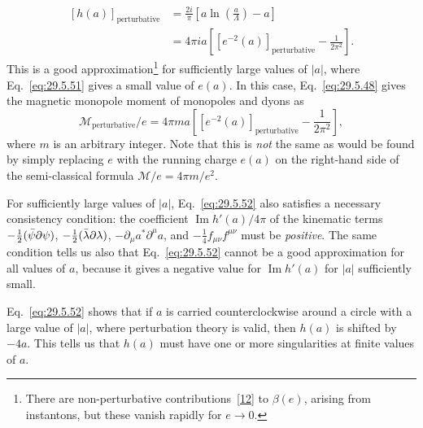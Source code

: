\begin{equation}
  \begin{aligned}
  [h(a)]_{\mathrm{perturbative}}
  &=\frac{2i}{\pi}\left[
    a\ln\left(\frac{a}{\Lambda}\right)-a
  \right]
  \\
  &=4\pi ia\left[
    \left[e^{-2}(a)\right]_{\mathrm{perturbative}}
    -\frac{1}{2\pi^2}
  \right].
  \end{aligned}
  \tag{29.5.52}\label{eq:29.5.52}
\end{equation}
\enlargethispage{2pt}
This is a good approximation\footnote{There are non-perturbative
contributions~\hyperref[ch29-ref-12]{[12]} to \(\beta(e)\), arising from
instantons, but these vanish rapidly for \(e\longrightarrow0\).} for
sufficiently large values of \(\lvert a\rvert\), where
Eq.~\eqref{eq:29.5.51} gives a small value of \(e(a)\). In this case,
Eq.~\eqref{eq:29.5.48} gives the magnetic monopole moment of monopoles and
dyons as
\begin{equation}
  \mathcal{M}_{\mathrm{perturbative}}/e
  =4\pi ma\left[
    \left[e^{-2}(a)\right]_{\mathrm{perturbative}}
    -\frac{1}{2\pi^2}
  \right],
  \tag{29.5.53}\label{eq:29.5.53}
\end{equation}
where \(m\) is an arbitrary integer. Note that this is \textit{not} the same
as would be found by simply replacing \(e\) with the running charge \(e(a)\)
on the right-hand side of the semi-classical formula
\(\mathcal{M}/e=4\pi m/e^2\).

{\setlength{\emergencystretch}{1em}%
For sufficiently large values of \(\lvert a\rvert\), Eq.~\eqref{eq:29.5.52}
also satisfies a necessary consistency condition: the coefficient
\(\operatorname{Im}h'(a)/4\pi\) of the kinematic terms
\(-\tfrac12(\bar\psi\sl{\partial}\psi)\),
\(-\tfrac12(\bar\lambda\sl{\partial}\lambda)\),
\(-\partial_\mu a^*\partial^\mu a\), and
\(-\tfrac14f_{\mu\nu}f^{\mu\nu}\) must be \textit{positive}. The same
condition tells us also that Eq.~\eqref{eq:29.5.52} cannot be a good
approximation for all values of \(a\), because it gives a negative value for
\(\operatorname{Im}h'(a)\) for \(\lvert a\rvert\) sufficiently small.\par}

Eq.~\eqref{eq:29.5.52} shows that if \(a\) is carried counterclockwise around
a circle with a large value of \(\lvert a\rvert\), where perturbation theory
is valid, then \(h(a)\) is shifted by \(-4a\). This tells us that \(h(a)\)
must have one or more singularities at finite values of \(a\).

